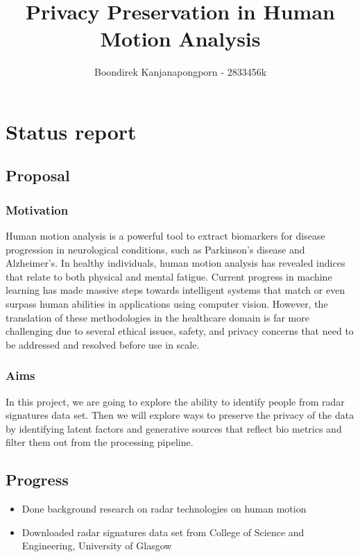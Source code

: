 \documentclass[11pt]{article}
\title{Privacy Preservation in Human Motion Analysis}
\author{Boondirek Kanjanapongporn - 2833456k}
\begin{document}
    \maketitle
    
    
     

\section{Status report}

\subsection{Proposal}\label{proposal}

\subsubsection{Motivation}\label{motivation}

Human motion analysis is a powerful tool to extract biomarkers for disease progression in neurological conditions, such as Parkinson's disease and Alzheimer’s. In healthy individuals, human motion analysis has revealed indices that relate to both physical and mental fatigue. Current progress in machine learning has made massive steps towards intelligent systems that match or even surpass human abilities in applications using computer vision. However, the translation of these methodologies in the healthcare domain is far more challenging due to several ethical issues, safety, and privacy concerns that need to be addressed and resolved before use in scale.

\subsubsection{Aims}\label{aims}

In this project, we are going to explore the ability to identify people from radar signatures data set. Then we will explore ways to preserve the privacy of the data by identifying latent factors and generative sources that reflect bio metrics and filter them out from the processing pipeline.

\subsection{Progress}\label{progress}

\begin{itemize}
  \item Done background research on radar technologies on human motion
  \item Downloaded radar signatures data set from College of Science and Engineering, University of Glasgow
\end{itemize}
\end{document}
